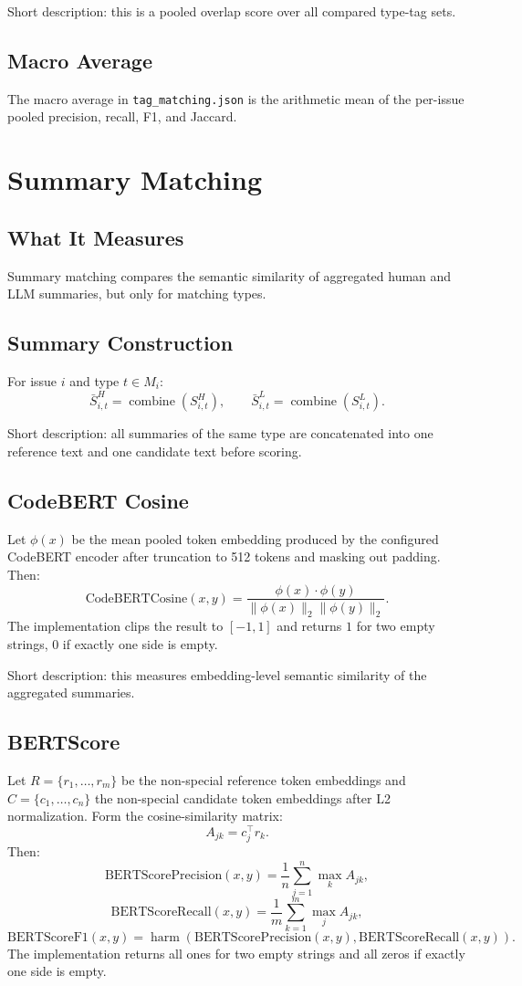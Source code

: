 \documentclass[11pt]{article}
\begin{document}
Short description: this is a pooled overlap score over all compared type-tag sets.

\subsection{Macro Average}
The macro average in \texttt{tag\_matching.json} is the arithmetic mean of the per-issue pooled precision, recall, F1, and Jaccard.

\section{Summary Matching}
\subsection{What It Measures}
Summary matching compares the semantic similarity of aggregated human and LLM summaries, but only for matching types.

\subsection{Summary Construction}
For issue $i$ and type $t \in M_i$:
\[
\bar{S}_{i,t}^{H} = \operatorname{combine}(S_{i,t}^{H}),\qquad
\bar{S}_{i,t}^{L} = \operatorname{combine}(S_{i,t}^{L}).
\]

Short description: all summaries of the same type are concatenated into one reference text and one candidate text before scoring.

\subsection{CodeBERT Cosine}
Let $\phi(x)$ be the mean pooled token embedding produced by the configured CodeBERT encoder after truncation to 512 tokens and masking out padding. Then:
\[
\mathrm{CodeBERTCosine}(x,y)=
\frac{\phi(x)\cdot\phi(y)}{\|\phi(x)\|_2\|\phi(y)\|_2}.
\]
The implementation clips the result to $[-1,1]$ and returns $1$ for two empty strings, $0$ if exactly one side is empty.

Short description: this measures embedding-level semantic similarity of the aggregated summaries.

\subsection{BERTScore}
Let $R=\{r_1,\dots,r_m\}$ be the non-special reference token embeddings and $C=\{c_1,\dots,c_n\}$ the non-special candidate token embeddings after L2 normalization. Form the cosine-similarity matrix:
\[
A_{jk}=c_j^\top r_k.
\]
Then:
\[
\mathrm{BERTScorePrecision}(x,y)=\frac{1}{n}\sum_{j=1}^{n}\max_k A_{jk},
\]
\[
\mathrm{BERTScoreRecall}(x,y)=\frac{1}{m}\sum_{k=1}^{m}\max_j A_{jk},
\]
\[
\mathrm{BERTScoreF1}(x,y)=\operatorname{harm}(\mathrm{BERTScorePrecision}(x,y),\mathrm{BERTScoreRecall}(x,y)).
\]
The implementation returns all ones for two empty strings and all zeros if exactly one side is empty.
\end{document}
